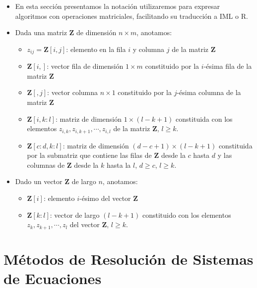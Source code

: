 \documentclass[openany]{book}
\providecommand{\tightlist}{%
  \setlength{\itemsep}{0pt}\setlength{\parskip}{0pt}}
\begin{document}
\begin{itemize}
\item
  En esta sección presentamos la notación utilizaremos para expresar algoritmos con operaciones matriciales, facilitando su traducción a IML o R.
\item
  Dada una matriz \(\mathbf{Z}\) de dimensión \(n \times m\), anotamos:

  \begin{itemize}
  \tightlist
  \item
    \(z_{ij} = \mathbf{Z}[i, j]\): elemento en la fila \(i\) y columna \(j\) de la matriz \(\mathbf{Z}\)
  \item
    \(\mathbf{Z}[i,]\): vector fila de dimensión \(1\times m\) constituido por la \(i\)-ésima fila de la matriz \(\mathbf{Z}\)
  \item
    \(\mathbf{Z}[,j]\): vector columna \(n\times 1\) constituido por la \(j\)-ésima columna de la matriz \(\mathbf{Z}\)
  \item
    \(\mathbf{Z}[i,k:l]\): matriz de dimensión \(1\times (l-k+1)\) constituida con los elementos \(z_{i,k}, z_{i,k+1}, \cdots, z_{i,l}\) de la matriz \(\mathbf{Z}\), \(l \geq k\).
  \item
    \(\mathbf{Z}[c:d,k:l]\): matriz de dimensión \((d-c+1)\times (l-k+1)\) constituida por la submatriz que contiene las filas de \(\mathbf{Z}\) desde la \(c\) hasta \(d\) y las columnas de \(\mathbf{Z}\) desde la \(k\) hasta la \(l\), \(d \geq c\), \(l \geq k\).
  \end{itemize}
\item
  Dado un vector \(\mathbf{Z}\) de largo \(n\), anotamos:

  \begin{itemize}
  \tightlist
  \item
    \(\mathbf{Z}[i]\): elemento \(i\)-ésimo del vector \(\mathbf{Z}\)
  \item
    \(\mathbf{Z}[k:l]\): vector de largo \((l-k+1)\) constituido con los elementos \(z_{k}, z_{k+1}, \cdots, z_{l}\) del vector \(\mathbf{Z}\), \(l \geq k\).
  \end{itemize}
\end{itemize}

\hypertarget{muxe9todos-de-resoluciuxf3n-de-sistemas-de-ecuaciones}{%
\section{Métodos de Resolución de Sistemas de Ecuaciones}\label{muxe9todos-de-resoluciuxf3n-de-sistemas-de-ecuaciones}}
\end{document}
